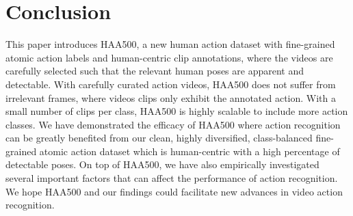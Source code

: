 \documentclass[10pt,twocolumn,letterpaper]{article}
\begin{document}
\vspace{-0.5em}
\section{Conclusion}
\vspace{-0.5em}

This paper introduces HAA500, a new human action dataset with fine-grained atomic action labels and human-centric clip annotations, where the videos are carefully selected such that the relevant human poses are apparent and detectable. With carefully curated action videos, HAA500 does not suffer from irrelevant frames, where videos clips only exhibit the annotated action. With a small number of clips per class, HAA500 is highly scalable to include more action classes. We have demonstrated the efficacy of HAA500 where action recognition can be greatly benefited from our clean, highly diversified, class-balanced fine-grained atomic action dataset which is human-centric with a high percentage of detectable poses. On top of HAA500, we have also empirically investigated several important factors that can affect the performance of action recognition. We hope HAA500 and our findings could facilitate new advances in video action recognition.

{\small


}
\end{document}
